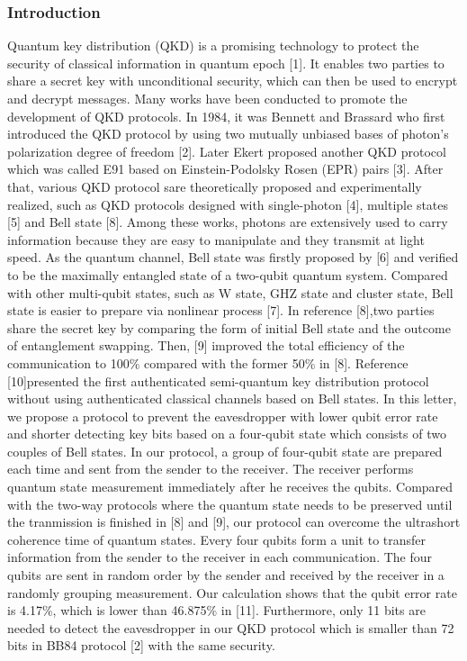 \subsubsection{Introduction}
Quantum key distribution (QKD) is a promising technology to protect the security of classical information in quantum epoch [1]. It enables two parties to share a secret key with unconditional security, which can then be used to encrypt and decrypt messages. Many works have been conducted to promote the development of QKD protocols. In 1984, it was Bennett and Brassard who first introduced the QKD protocol by using two mutually unbiased bases of photon’s polarization degree of freedom [2]. Later Ekert proposed another QKD protocol which was called E91 based on Einstein-Podolsky Rosen (EPR) pairs [3]. After that, various QKD protocol sare theoretically proposed and experimentally realized, such as QKD protocols designed with single-photon [4], multiple states [5] and Bell state [8]. Among these works, photons are extensively used to carry information because they are easy to manipulate and they transmit at light speed.
As the quantum channel, Bell state was firstly proposed by [6] and verified to be the maximally entangled state of a two-qubit quantum system. Compared with other multi-qubit states, such as W state, GHZ state and cluster state, Bell state is easier to prepare via nonlinear process [7]. In reference [8],two parties share the secret key by comparing the form of initial Bell state and the outcome of entanglement swapping.
Then, [9] improved the total efficiency of the communication to 100\% compared with the former 50\% in [8]. Reference [10]presented the first authenticated semi-quantum key distribution protocol without using authenticated classical channels based on Bell states. In this letter, we propose a protocol to prevent the eavesdropper with lower qubit error rate and shorter detecting key bits based on a four-qubit state which consists of two couples of Bell states.
In our protocol, a group of four-qubit state are prepared each time and sent from the sender to the receiver. The receiver performs quantum state measurement immediately after he receives the qubits. Compared with the two-way protocols where the quantum state needs to be preserved until the tranmission is finished in [8] and [9], our protocol can overcome the ultrashort coherence time of quantum states.
Every four qubits form a unit to transfer information from the sender to the receiver in each communication. The four qubits are sent in random order by the sender and received by the receiver in a randomly grouping measurement. Our calculation shows that the qubit error rate is 4.17\%, which is lower than 46.875\% in [11]. Furthermore, only 11 bits are needed to detect the eavesdropper in our QKD protocol which is smaller than 72 bits in BB84 protocol [2] with the same security.
